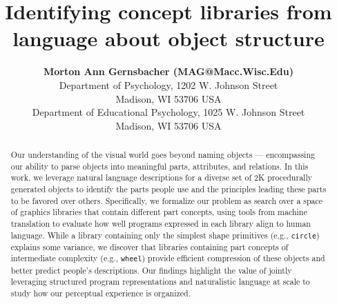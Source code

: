 \documentclass[10pt,letterpaper]{article}
\title{Identifying concept libraries from language about object structure}
\author{{\large \bf Morton Ann Gernsbacher (MAG@Macc.Wisc.Edu)} \\
  Department of Psychology, 1202 W. Johnson Street \\
  Madison, WI 53706 USA
  \AND {\large \bf Sharon J.~Derry (SDJ@Macc.Wisc.Edu)} \\
  Department of Educational Psychology, 1025 W. Johnson Street \\
  Madison, WI 53706 USA}
\begin{document}
\maketitle


\begin{abstract} 
Our understanding of the visual world goes beyond naming objects --- encompassing our ability to parse objects into meaningful parts, attributes, and relations. 
In this work, we leverage natural language descriptions for a diverse set of 2K procedurally generated objects to identify the parts people use and the principles leading these parts to be favored over others.
Specifically, we formalize our problem as search over a space of graphics libraries that contain different part concepts, using tools from machine translation to evaluate how well programs expressed in each library align to human language.
While a library containing only the simplest shape primitives (e.g., \texttt{circle}) explains some variance, we discover that libraries containing part concepts of intermediate complexity (e.g., \texttt{wheel}) provide efficient compression of these objects and better predict people's descriptions.
Our findings highlight the value of jointly leveraging structured program representations and naturalistic language at scale to study how our perceptual experience is organized.



\end{abstract}
\end{document}
